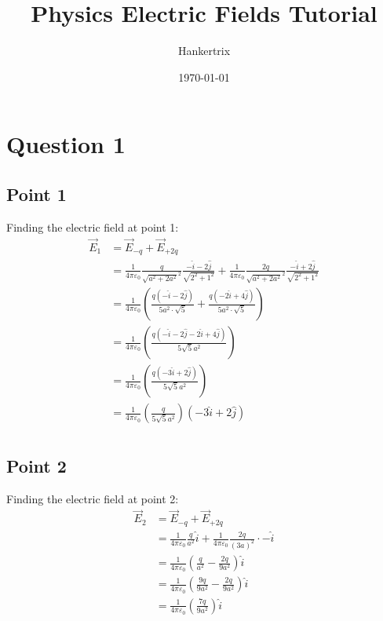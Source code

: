 \documentclass[11pt]{article}
\author{Hankertrix}
\date{\today}
\title{Physics Electric Fields Tutorial}
\begin{document}
\maketitle
\setcounter{tocdepth}{2}
\tableofcontents

\newpage

\section{Question 1}
\label{sec:org6d9ca8e}

\subsection{Point 1}
\label{sec:orga79d299}
Finding the electric field at point 1:
\begin{align*}
\vec{E}_1 &= \vec{E}_{-q} + \vec{E}_{+2q} \\
&= \frac{1}{4 \pi \varepsilon_0} \frac{q}{\sqrt{a^2 + 2a^2}^2} \frac{-\hat{i} - 2\hat{j}}{\sqrt{2^2 + 1^2}} + \frac{1}{4 \pi \varepsilon_0} \frac{2q}{\sqrt{a^2 +2a^2}^2} \frac{-\hat{i} + 2\hat{j}}{\sqrt{2^2 + 1^2}} \\
&= \frac{1}{4 \pi \varepsilon_0} \left( \frac{q(- \hat{i} - 2 \hat{j})}{5a^2 \cdot \sqrt{5}} + \frac{q( -2 \hat{i} + 4 \hat{j})}{5a^2 \cdot \sqrt{5}} \right) \\
&= \frac{1}{4 \pi \varepsilon_0} \left( \frac{q(- \hat{i} - 2 \hat{j} - 2 \hat{i} + 4 \hat{j})}{5 \sqrt{5} a^2} \right) \\
&= \frac{1}{4 \pi \varepsilon_0} \left( \frac{q(-3 \hat{i} + 2 \hat{j})}{5 \sqrt{5} a^2} \right) \\
&= \frac{1}{4 \pi \varepsilon_0} \left( \frac{q}{5 \sqrt{5} a^2} \right) (-3 \hat{i} + 2 \hat{j}) \\
\end{align*}

\subsection{Point 2}
\label{sec:org1bdfe82}
Finding the electric field at point 2:
\begin{align*}
\vec{E}_2 &= \vec{E}_{-q} + \vec{E}_{+2q} \\
&= \frac{1}{4 \pi \varepsilon_0} \frac{q}{a^2} \hat{i} + \frac{1}{4 \pi \varepsilon_0} \frac{2q}{(3a)^2} \cdot - \hat{i} \\
&= \frac{1}{4 \pi \varepsilon_0} \left( \frac{q}{a^2} - \frac{2q}{9a^2} \right) \hat{i} \\
&= \frac{1}{4 \pi \varepsilon_0} \left( \frac{9q}{9a^2} - \frac{2q}{9a^2} \right) \hat{i} \\
&= \frac{1}{4 \pi \varepsilon_0} \left( \frac{7q}{9a^2} \right) \hat{i} \\
\end{align*}
\end{document}
